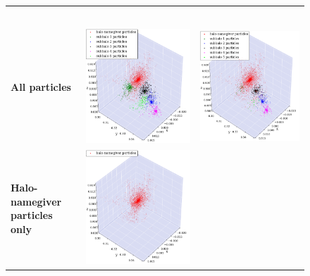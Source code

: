 \begin{subfigures}
	\begin{figure}[!htbp]
		{
			\renewcommand{\arraystretch}{0.1}		
			\centering	
			\begin{tabular}{|p{.5cm} c c|}
				\hline
				&&\\[1em]
				&	\phewon\ 	& \simple \\[1.5em]
				\begin{sideways}{\hspace{3cm} \textbf{All particles}}\end{sideways} \hspace*{-1em}	&		 
				{\includegraphics[width = .42\textwidth]{images/cosmo/cos-halo-66858-phew.png}} \hspace*{-1em} 	& 
				{\includegraphics[width = .42\textwidth]{images/cosmo/cos-halo-66858-nosaddle.png}} \hspace*{-1em}	\\
				\begin{sideways}{ \hspace{.5cm}\textbf{Halo-namegiver particles only} }\end{sideways}	 \hspace*{-1em}			 &			 
				{\includegraphics[width = .42\textwidth]{images/cosmo/cos-halo-66858-halo-only-phew.png}} \hspace*{-1em} 		&

\end{tabular}}
\end{figure}
\end{subfigures}
